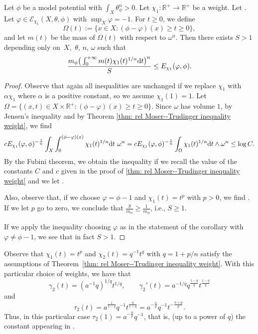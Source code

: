 \documentclass[pdftex]{sigma}
\numberwithin{equation}{section}
\theoremstyle{plain}
\newcommand{\R}{\mathbb R}
\begin{document}
\begin{corollary}
Let $\phi$ be a model potential with $\int_X \theta_\phi^n>0$. Let $\chi_1\colon\R^+\rightarrow \R^+ $ be a weight. Let . Let $\varphi\in \mathcal{E}_{\chi_1}(X,\theta, \phi)$ with $\sup_X \varphi=-1$. For $t \geq 0 $, we define
\[\Omega(t) := \{ x \in X\colon (\phi-\varphi)(x) \geq t \geq 0 \},\]
 and let $m(t)$ be the mass of $\Omega(t)$ with respect to $\omega^n$. Then there exists $ S > 1$ depending only on~$X$,~$\theta$, $n$, $\omega$ such that
\[ \frac{ m_\phi \big(\int_0^{+\infty} m(t) \chi_1(t)^{1/n} {\rm d}t\big)^n}{S} \leq E_{\chi_1}( \varphi, \phi).\]
\end{corollary}
\begin{proof}
Observe that again all inequalities are unchanged if we replace $\chi_1$ with $\alpha \chi_1$ where $\alpha$ is a positive constant, so we assume $\chi_1(1) = 1$.
Let $\Omega = \{(x,t) \in X \times \mathbb{R}^+ \colon (\phi - \varphi)(x) \geq t\geq 0\}$.
Since $\omega$ has volume $1$, by Jensen's inequality and by Theorem \ref{thm: rel Moser--Trudinger inequality weight}, we find
\[c E_{\chi_1}(\varphi,\phi)^{-\frac{1}{n}} \int_X \int_0^{(\phi-\varphi)(x)} \chi_1(t)^{1/n} {\rm d}t \ \omega^n = c E_{\chi_1}(\varphi, \phi)^{-\frac{1}{n}} \int_\Omega \chi_1(t)^{1/n} {\rm d}t \wedge \omega^n \leq \log C. \]
By the Fubini theorem, we obtain the inequality if we recall the value of the constants $C$ and $c$ given in the proof of \ref{thm: rel Moser--Trudinger inequality weight} and we let
.

Also, observe that, if we choose $\varphi = \phi-1$ and $\chi_1(t) = t^p$ with $p > 0 $, we find . If we let $p$ go to zero, we conclude that $\frac{S}{m_{\phi}} \geq \frac{1}{m_{\phi}}$, i.e., $S \geq 1$.

If we apply the inequality choosing $\varphi$ as in the statement of the corollary with $\varphi \neq \phi -1$, we see that in fact $S > 1$.
\end{proof}

\begin{Remark}
\label{rem:Case p}
Observe that $\chi_1(t)=t^p$ and $\chi_2(t)= q^{-1}t^q$ with $q=1+p/n$ satisfy the assumptions of Theorem~\ref{thm: rel Moser--Trudinger inequality weight}. With this particular choice of weights, we have that
\[\gamma_2(t)=(a^{-1}q)^{1/q} t^{1/q}, \qquad \gamma_2'(t)=a^{-1/q} q^{\frac{1-q}{q}} t^{\frac{1-q}{q}}\] and
 \[ \tau_2(t)= a^{\frac{1}{1-q}} q^{-1}t^{\frac{q}{1-q}}=a^{-\frac{n}{p}} q^{-1}t^{-\frac{n+p}{p}}.\]
 Thus, in this particular case $\tau_2(1)=a^{-\frac{n}{p}} q^{-1} $, that is, (up to a power of $q$) the constant appearing in \cite[Theorem 2.11]{DNL21}.
\end{Remark}
\end{document}
